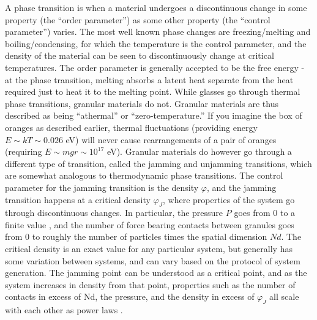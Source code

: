 A phase transition is when a material undergoes a discontinuous change in some property (the ``order parameter'') as some other property (the ``control parameter'') varies. The most well known phase changes are freezing/melting and boiling/condensing, for which the temperature is the control parameter, and the density of the material can be seen to discontinuously change at critical temperatures. The order parameter is generally accepted to be the free energy - at the phase transition, melting absorbs a latent heat separate from the heat required just to heat it to the melting point.  While glasses go through thermal phase transitions, granular materials do not. Granular materials are thus described as being ``athermal'' or ``zero-temperature.'' If you imagine the box of oranges as described earlier, thermal fluctuations (providing energy $E \sim kT \sim 0.026$ eV) will never cause rearrangements of a pair of oranges (requiring $E \sim mgr \sim 10^{17}$ eV). Granular materials do however go through a different type of transition, called the jamming and unjamming transitions, which are somewhat analogous to thermodynamic phase transitions. The control parameter for the jamming transition is the  density $\varphi$, and the jamming transition happens at a critical density $\varphi_J$, where properties of the system go through discontinuous changes. In particular, the pressure $P$ goes from 0 to a finite value , and the number of force bearing contacts between granules goes from 0 to roughly the number of particles times the spatial dimension $Nd$. The critical density is an exact value for any particular system, but generally has some variation between systems, and can vary based on the protocol of system generation. The jamming point can be understood as a critical point, and as the system increases in density from that point, properties such as the number of contacts in excess of Nd, the pressure, and the density in excess of $\varphi_J$ all scale with each other as power laws \cite{ohern_jamming_2003,goodrich_scaling_2016}.


